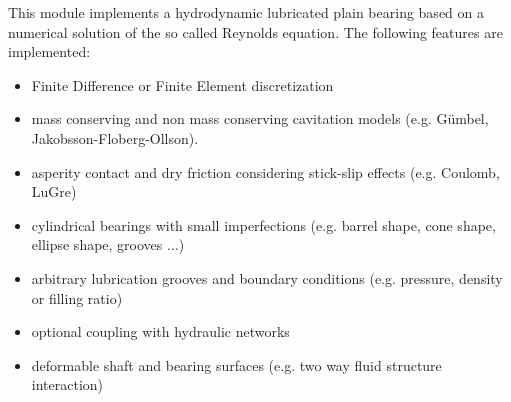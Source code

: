 %
%
%
%
%
%
%
%

This module implements a hydrodynamic lubricated plain bearing based on a numerical solution of the so called Reynolds equation\cite{DIRKBARTEL2010}. The following features are implemented:
\begin{itemize}
\item Finite Difference or Finite Element discretization
\item mass conserving and non mass conserving cavitation models (e.g. G\"umbel, Jakobsson-Floberg-Ollson).
\item asperity contact and dry friction considering stick-slip effects (e.g. Coulomb, LuGre)
\item cylindrical bearings with small imperfections (e.g. barrel shape, cone shape, ellipse shape, grooves $\hdots$)
\item arbitrary lubrication grooves and boundary conditions (e.g. pressure, density or filling ratio)
\item optional coupling with hydraulic networks
\item deformable shaft and bearing surfaces (e.g. two way fluid structure interaction)
\end{itemize}

